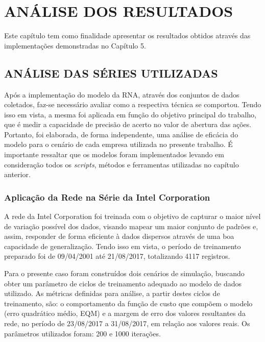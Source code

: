
\chapter{ANÁLISE DOS RESULTADOS}\label{ch:resultados}
Este capítulo tem como finalidade apresentar os resultados obtidos através das implementações demonstradas no Capítulo 5.

\section{ANÁLISE DAS SÉRIES UTILIZADAS}
Após a implementação do modelo da RNA, através dos conjuntos de dados coletados, faz-se necessário avaliar como a respectiva técnica se comportou. Tendo isso em vista, a mesma foi aplicada em função do objetivo principal do trabalho, que é medir a capacidade de precisão de acerto no valor de abertura das ações. Portanto, foi elaborada, de forma independente, uma análise de eficácia do modelo para o cenário de cada empresa utilizada no presente trabalho. É importante ressaltar que os modelos foram implementados levando em consideração todos os \textit{scripts}, métodos e ferramentas utilizadas no capítulo anterior.

\subsection{Aplicação da Rede na Série da Intel Corporation}
A rede da Intel Corporation foi treinada com o objetivo de capturar o maior nível de variação possível dos dados, visando mapear um maior conjunto de padrões e, assim, responder de forma eficiente à dados dispersos através de uma boa capacidade de generalização. Tendo isso em vista, o período de treinamento preparado foi de 09/04/2001 até 21/08/2017, totalizando 4117 registros.

Para o presente caso foram construídos dois cenários de simulação, buscando obter um parâmetro de ciclos de treinamento adequado ao modelo de dados utilizado. As métricas definidas para análise, a partir destes ciclos de treinamento, são: o comportamento da função de custo que compõem o modelo (erro quadrático médio, EQM) e a margem de erro dos valores resultantes da rede, no período de 23/08/2017 a 31/08/2017, em relação aos valores reais. Os parâmetros utilizados foram: 200 e 1000 iterações.

